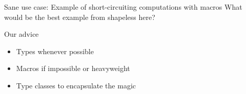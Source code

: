 \documentclass{beamer}
\begin{document}
\begin{frame}{Sane use case: Example of short-circuiting computations with macros}
  What would be the best example from shapeless here?
\end{frame}

\begin{frame}{Our advice}
  \begin{itemize}
  \item Types whenever possible
  \item Macros if impossible or heavyweight
  \item Type classes to encapsulate the magic
  \end{itemize}
\end{frame}

\begin{frame}
\vskip40pt
\begin{center}
\end{center}
\end{frame}

\begin{frame}
\vskip40pt
\begin{center}
\end{center}
\end{frame}
\end{document}
